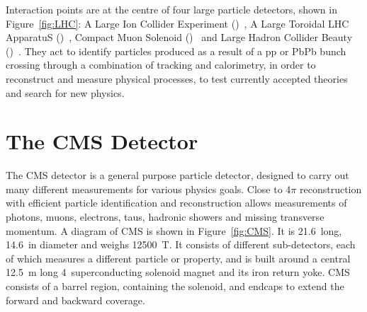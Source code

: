 Interaction points are at the centre of four large particle detectors, shown in Figure~\ref{fig:LHC}:
A Large Ion Collider Experiment (\ALICE)~\cite{Aamodt:2008zz}, 
A Large Toroidal LHC ApparatuS (\ATLAS)~\cite{Aad:2008zzm}, 
Compact Muon Solenoid (\CMS)~\cite{Chatrchyan:2008aa} and 
Large Hadron Collider Beauty (\LHCb)~\cite{Alves:2008zz}.
They act to identify particles produced as a result of a pp or PbPb bunch crossing through a combination of tracking and calorimetry, in order to reconstruct and measure physical processes, to test currently accepted theories and search for new physics.


\section{The CMS Detector}
\label{sec:CMS}

The \ac{CMS} detector is a general purpose particle detector, designed to carry out many different measurements for various physics goals.
Close to 4$\pi$ reconstruction with 
efficient particle identification and reconstruction allows measurements of photons, muons, electrons, taus, hadronic showers and missing transverse momentum.
%
A diagram of \ac{CMS} is shown in Figure~\ref{fig:CMS}. It is 21.6~\m long, 14.6~\m in diameter and weighs 12500~T. 
It consists of different sub-detectors, each of which measures a different particle or property, 
and is built around a central 12.5~m long 4~\T superconducting solenoid magnet and its iron return yoke.
%
\ac{CMS} consists of a barrel region, containing the solenoid, and endcaps to extend the forward and backward coverage.

